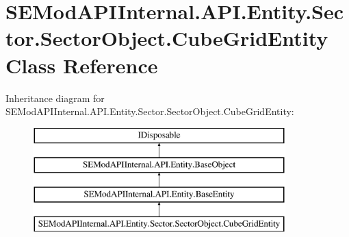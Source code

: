 \hypertarget{class_s_e_mod_a_p_i_internal_1_1_a_p_i_1_1_entity_1_1_sector_1_1_sector_object_1_1_cube_grid_entity}{}\section{S\+E\+Mod\+A\+P\+I\+Internal.\+A\+P\+I.\+Entity.\+Sector.\+Sector\+Object.\+Cube\+Grid\+Entity Class Reference}
\label{class_s_e_mod_a_p_i_internal_1_1_a_p_i_1_1_entity_1_1_sector_1_1_sector_object_1_1_cube_grid_entity}
Inheritance diagram for S\+E\+Mod\+A\+P\+I\+Internal.\+A\+P\+I.\+Entity.\+Sector.\+Sector\+Object.\+Cube\+Grid\+Entity\+:\begin{figure}[H]
\begin{center}
\leavevmode
\includegraphics[height=4.000000cm]{class_s_e_mod_a_p_i_internal_1_1_a_p_i_1_1_entity_1_1_sector_1_1_sector_object_1_1_cube_grid_entity}
\end{center}
\end{figure}
